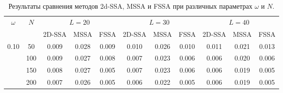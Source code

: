 \documentclass[12pt, specialist, subf
]{disser}
\theoremstyle{definition}
\begin{document}
\begin{table}[H]
	\caption{Результаты сравнения методов 2d-SSA, MSSA и FSSA при различных параметрах $\omega$ и $N$.}
	\centering
	\label{tab:sim_fssa}
	\begin{tabular}{c|c|ccc|ccc|ccc}
		\toprule
		\multicolumn{1}{c|}{$\omega$} & \multicolumn{1}{c|}{$N$} & \multicolumn{3}{c|}{$L=20$} & \multicolumn{3}{c|}{$L=30$} & \multicolumn{3}{c}{$L=40$}                                                   \\
		                              &                          & 2D-SSA                      & MSSA                        & FSSA                       & 2D-SSA & MSSA  & FSSA  & 2D-SSA & MSSA  & FSSA  \\
		\midrule
		\multirow{4}{*}{0.10}         & 50                       & 0.009                       & 0.028                       & 0.009                      & 0.010  & 0.026 & 0.010 & 0.011  & 0.021 & 0.013 \\
		                              & 100                      & 0.009                       & 0.027                       & 0.008                      & 0.007  & 0.023 & 0.006 & 0.006  & 0.020 & 0.006 \\
		                              & 150                      & 0.008                       & 0.027                       & 0.005                      & 0.007  & 0.023 & 0.006 & 0.006  & 0.019 & 0.005 \\
		                              & 200                      & 0.007                       & 0.026                       & 0.005                      & 0.006  & 0.022 & 0.005 & 0.006  & 0.019 & 0.005 \\

\end{tabular}
\end{table}
\end{document}
